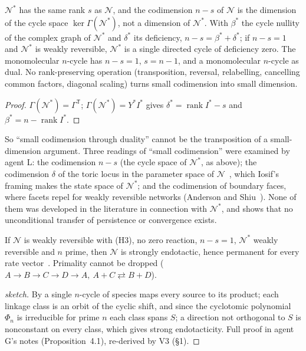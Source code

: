\documentclass[11pt,a4paper]{report}
\newcommand{\Net}{\mathcal{N}}
\newcommand{\Nd}{\mathcal{N}^{*}}
\newcommand{\tp}{^{\mathsf T}}
\begin{document}
\begin{proposition}\label{prop:dimension}
\(\Nd\) has the same rank \(s\) as \(\Net\), and the codimension \(n-s\) of \(\Net\) is the dimension of the cycle space
\(\ker\Gamma(\Nd)\), not a dimension of \(\Nd\). With \(\beta^*\) the cycle nullity of the complex graph of \(\Nd\) and
\(\delta^*\) its deficiency, \(n-s=\beta^*+\delta^*\); if \(n-s=1\) and \(\Nd\) is weakly reversible, \(\Nd\) is a single
directed cycle of deficiency zero. The monomolecular \(n\)-cycle has \(n-s=1\), \(s=n-1\), and a monomolecular \(n\)-cycle as
dual. No rank-preserving operation (transposition, reversal, relabelling, cancelling common factors, diagonal scaling)
turns small codimension into small dimension.
\end{proposition}
\begin{proof}
\(\Gamma(\Nd)=\Gamma\tp\); \(\Gamma(\Nd)=Y^*I^*\) gives \(\delta^*=\operatorname{rank}I^*-s\) and \(\beta^*=n-\operatorname{rank}I^*\).
\end{proof}

So ``small codimension through duality'' cannot be the transposition of a small-dimension argument. Three readings of
``small codimension'' were examined by agent L: the codimension \(n-s\) (the cycle space of \(\Nd\), as above); the
codimension \(\delta\) of the toric locus in the parameter space of \(\Net\)~\autocite[Thm~9]{CDSS2009}, which Iosif's framing
makes the state space of \(\Nd\); and the codimension of boundary faces, where facets repel for weakly reversible networks
(Anderson and Shiu~\autocite{AndersonShiu2010}). None of them was developed in the literature in connection with \(\Nd\), and
 shows that no unconditional transfer of persistence or convergence exists.

\begin{proposition}\label{prop:prime}
If \(\Net\) is weakly reversible with (H3), no zero reaction, \(n-s=1\), \(\Nd\) weakly reversible and \(n\) prime, then \(\Net\)
is strongly endotactic, hence permanent for every rate vector~\autocite{GopalkrishnanMillerShiu2014}. Primality cannot be
dropped (\(A\to B\to C\to D\to A,\ A+C\rightleftarrows B+D\)).
\end{proposition}
\begin{proof}[sketch]
By  a single \(n\)-cycle of species maps every source to its product; each linkage class is an orbit of
the cyclic shift, and since the cyclotomic polynomial \(\Phi_n\) is irreducible for prime \(n\) each class spans \(S\); a
direction not orthogonal to \(S\) is nonconstant on every class, which gives strong endotacticity. Full proof in
agent G's notes (Proposition~4.1), re-derived by V3 (§1).
\end{proof}
\end{document}
